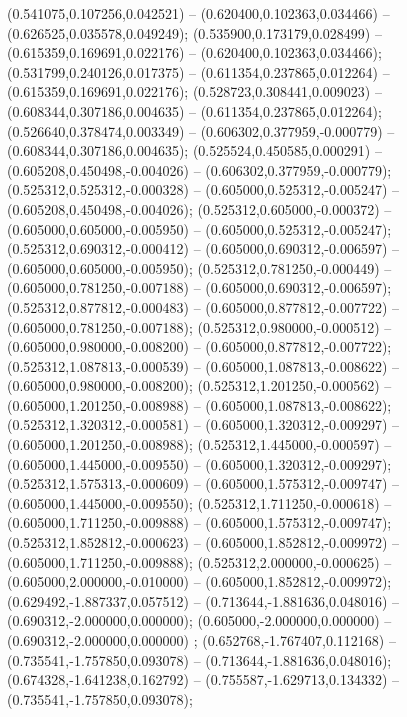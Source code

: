  (0.541075,0.107256,0.042521) -- (0.620400,0.102363,0.034466) -- (0.626525,0.035578,0.049249);
 (0.535900,0.173179,0.028499) -- (0.615359,0.169691,0.022176) -- (0.620400,0.102363,0.034466);
 (0.531799,0.240126,0.017375) -- (0.611354,0.237865,0.012264) -- (0.615359,0.169691,0.022176);
 (0.528723,0.308441,0.009023) -- (0.608344,0.307186,0.004635) -- (0.611354,0.237865,0.012264);
 (0.526640,0.378474,0.003349) -- (0.606302,0.377959,-0.000779) -- (0.608344,0.307186,0.004635);
 (0.525524,0.450585,0.000291) -- (0.605208,0.450498,-0.004026) -- (0.606302,0.377959,-0.000779);
 (0.525312,0.525312,-0.000328) -- (0.605000,0.525312,-0.005247) -- (0.605208,0.450498,-0.004026);
 (0.525312,0.605000,-0.000372) -- (0.605000,0.605000,-0.005950) -- (0.605000,0.525312,-0.005247);
 (0.525312,0.690312,-0.000412) -- (0.605000,0.690312,-0.006597) -- (0.605000,0.605000,-0.005950);
 (0.525312,0.781250,-0.000449) -- (0.605000,0.781250,-0.007188) -- (0.605000,0.690312,-0.006597);
 (0.525312,0.877812,-0.000483) -- (0.605000,0.877812,-0.007722) -- (0.605000,0.781250,-0.007188);
 (0.525312,0.980000,-0.000512) -- (0.605000,0.980000,-0.008200) -- (0.605000,0.877812,-0.007722);
 (0.525312,1.087813,-0.000539) -- (0.605000,1.087813,-0.008622) -- (0.605000,0.980000,-0.008200);
 (0.525312,1.201250,-0.000562) -- (0.605000,1.201250,-0.008988) -- (0.605000,1.087813,-0.008622);
 (0.525312,1.320312,-0.000581) -- (0.605000,1.320312,-0.009297) -- (0.605000,1.201250,-0.008988);
 (0.525312,1.445000,-0.000597) -- (0.605000,1.445000,-0.009550) -- (0.605000,1.320312,-0.009297);
 (0.525312,1.575313,-0.000609) -- (0.605000,1.575312,-0.009747) -- (0.605000,1.445000,-0.009550);
 (0.525312,1.711250,-0.000618) -- (0.605000,1.711250,-0.009888) -- (0.605000,1.575312,-0.009747);
 (0.525312,1.852812,-0.000623) -- (0.605000,1.852812,-0.009972) -- (0.605000,1.711250,-0.009888);
 (0.525312,2.000000,-0.000625) -- (0.605000,2.000000,-0.010000) -- (0.605000,1.852812,-0.009972);
 (0.629492,-1.887337,0.057512) -- (0.713644,-1.881636,0.048016) -- (0.690312,-2.000000,0.000000);
 (0.605000,-2.000000,0.000000) -- (0.690312,-2.000000,0.000000) ;
 (0.652768,-1.767407,0.112168) -- (0.735541,-1.757850,0.093078) -- (0.713644,-1.881636,0.048016);
 (0.674328,-1.641238,0.162792) -- (0.755587,-1.629713,0.134332) -- (0.735541,-1.757850,0.093078);
